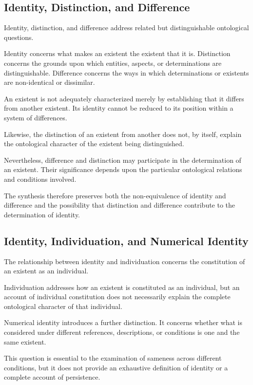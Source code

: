 \subsection{Identity, Distinction, and Difference}

Identity, distinction, and difference address related
but distinguishable ontological questions.

Identity concerns what makes an existent the existent
that it is. Distinction concerns the grounds upon which
entities, aspects, or determinations are distinguishable.
Difference concerns the ways in which determinations
or existents are non-identical or dissimilar.

An existent is not adequately characterized merely
by establishing that it differs from another existent.
Its identity cannot be reduced to its position within
a system of differences.

Likewise, the distinction of an existent from another
does not, by itself, explain the ontological character
of the existent being distinguished.

Nevertheless, difference and distinction may participate
in the determination of an existent. Their significance
depends upon the particular ontological relations and
conditions involved.

The synthesis therefore preserves both the
non-equivalence of identity and difference and the
possibility that distinction and difference contribute
to the determination of identity.

\subsection{Identity, Individuation, and Numerical Identity}

The relationship between identity and individuation
concerns the constitution of an existent as an individual.

Individuation addresses how an existent is constituted
as an individual, but an account of individual
constitution does not necessarily explain the complete
ontological character of that individual.

Numerical identity introduces a further distinction.
It concerns whether what is considered under different
references, descriptions, or conditions is one and
the same existent.

This question is essential to the examination of
sameness across different conditions, but it does
not provide an exhaustive definition of identity
or a complete account of persistence.

